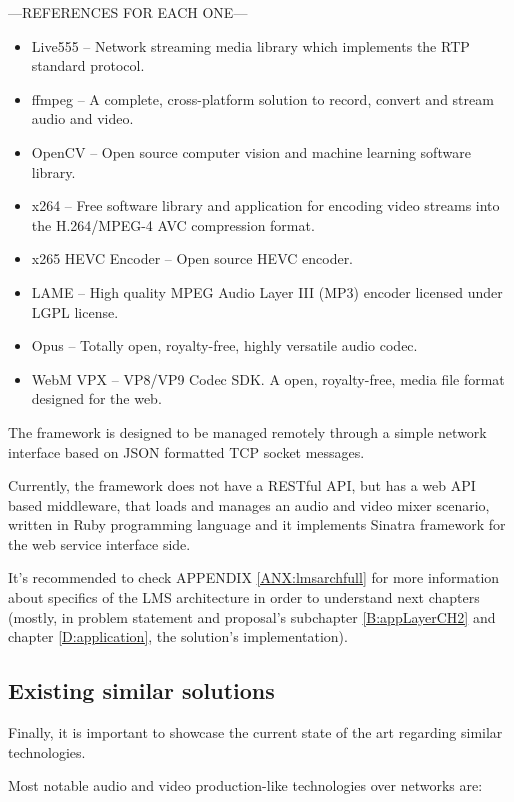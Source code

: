 ---REFERENCES FOR EACH ONE---
\begin{itemize}
\item Live555 – Network streaming media library which implements the RTP standard protocol.
\item ffmpeg – A complete, cross-platform solution to record, convert and stream audio and video.
\item OpenCV – Open source computer vision and machine learning software library.
\item x264 – Free software library and application for encoding video streams into the H.264/MPEG-4 AVC compression format.
\item x265 HEVC Encoder – Open source HEVC encoder.
\item LAME – High quality MPEG Audio Layer III (MP3) encoder licensed under LGPL license.
\item Opus – Totally open, royalty-free, highly versatile audio codec.
\item WebM VPX – VP8/VP9 Codec SDK. A open, royalty-free, media file format designed for the web.
\end{itemize}
 
The framework is designed to be managed remotely through a simple network interface based on JSON formatted TCP socket messages. 

Currently, the framework does not have a RESTful API, but has a web API based middleware, that loads and manages an audio and video mixer scenario, written in Ruby programming language and it implements Sinatra framework for the web service interface side.

It's recommended to check APPENDIX \ref{ANX:lmsarchfull} for more information about specifics of the LMS architecture in order to understand next chapters (mostly, in problem statement and proposal's subchapter \ref{B:appLayerCH2} and chapter \ref{D:application}, the solution's implementation).

\subsection{Existing similar solutions}\label{SOA:similarSolutions}

Finally, it is important to showcase the current state of the art regarding similar technologies.

Most notable audio and video production-like technologies over networks are:

